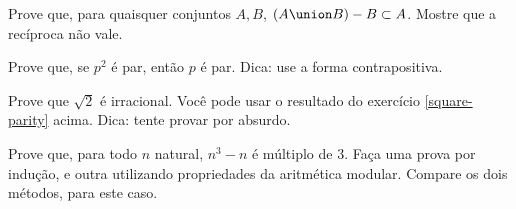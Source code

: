 \begin{exercise}
Prove que, para quaisquer conjuntos $A, B$, $(A \union B) - B \subset A$. Mostre que a recíproca não vale. 
\end{exercise}

\begin{exercise}
\label{square-parity}
Prove que, se $p^2$ é par, então $p$ é par.
Dica: use a forma contrapositiva.
\end{exercise}

\begin{exercise}
Prove que $\sqrt{2}$ é irracional. Você pode usar o resultado do exercício \ref{square-parity} acima.
Dica: tente provar por absurdo.
\end{exercise}

\begin{exercise}
Prove que, para todo $n$ natural, $n^3 - n$ é múltiplo de 3. Faça uma prova por indução, e outra utilizando propriedades da aritmética modular. Compare os dois métodos, para este caso.
\end{exercise}


